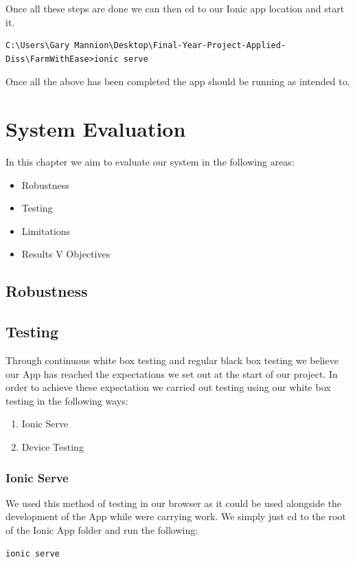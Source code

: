 \documentclass[12pt,a4paper,oneside,openany]{book}
\begin{document}
Once all these steps are done we can then cd to our Ionic app location and start it.
\begin{verbatim}
C:\Users\Gary Mannion\Desktop\Final-Year-Project-Applied-Diss\FarmWithEase>ionic serve
\end{verbatim}

Once all the above has been completed the app should be running as intended to.

\chapter{System Evaluation}
In this chapter we aim to evaluate our system in the following areas:
\begin{itemize}
    \item Robustness
    \item Testing
    \item Limitations
    \item Results V Objectives
\end{itemize}

\section{Robustness}

\section{Testing}
Through continuous white box testing and regular black box testing we believe our App has reached the expectations we set out at the start of our project. In order to achieve these expectation we carried out testing using our white box testing in the following ways:
\begin{enumerate}
    \item Ionic Serve
    \item Device Testing
\end{enumerate}

\subsection{Ionic Serve}
We used this method of testing in our browser as it could be used alongside the development of the App while were carrying work. We simply just cd to the root of the Ionic App folder and run the following:
\begin{verbatim}
ionic serve
\end{verbatim}
\end{document}
